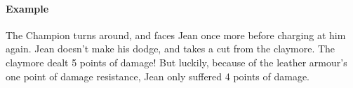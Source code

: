\paragraph{Example} The Champion turns around, and faces Jean once more before charging at him again.
Jean doesn't make his dodge, and takes a cut from the claymore.
The claymore dealt 5 points of damage!
But luckily, because of the leather armour's one point of damage resistance, Jean only suffered 4 points of damage.
